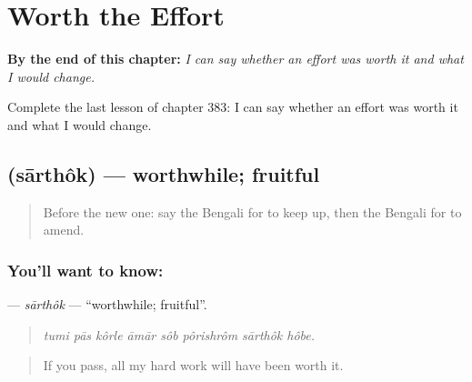 
\chapter{Worth the Effort}
\label{ch:bn-worth-the-effort}

\begin{chapteropening}
\textbf{By the end of this chapter:} \emph{I can say whether an effort was worth it and what I would change.}

Complete the last lesson of chapter 383: I can say whether an effort was worth it and what I would change.
\end{chapteropening}

\section[\texorpdfstring{\bn{সার্থক} (sārthôk)}{সার্থক (sārthôk)}]{ (sārthôk) — worthwhile; fruitful}

\label{lesson:BN-C383-sarthok}



\begin{quote}
Before the new one: say the Bengali for to keep up, then the Bengali for to amend.
\end{quote}

\subsection*{You'll want to know: }
\textbf{} — \emph{sārthôk} — \textquotedblleft{}worthwhile; fruitful\textquotedblright{}.

\begin{quote}
       
\end{quote}

\begin{quote}
\emph{tumi pās kôrle āmār sôb pôrishrôm sārthôk hôbe.}
\end{quote}

\begin{quote}
If you pass, all my hard work will have been worth it.
\end{quote}

